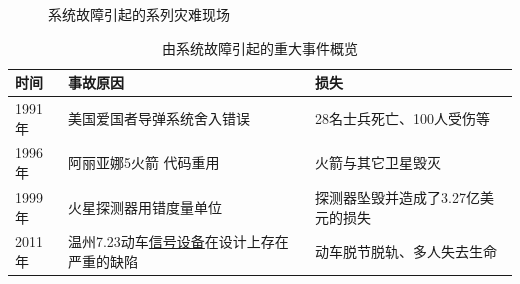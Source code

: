 \documentclass[9pt, CJK]{beamer}
\begin{document}
\begin{frame}
\begin{figure}
				\caption{系统故障引起的系列灾难现场}
			\end{figure}
			\begin{table}[htbp]
				\setlength{\abovecaptionskip}{-0.2cm}  %
				\setlength{\belowcaptionskip}{-0.4cm} %
				\fontsize{7pt}{\baselineskip}\selectfont
				\caption{由系统故障引起的重大事件概览}
				\label{tab:systemEvents_1.1}
				\centering
				\begin{tabular}{p{}p{}p{}}%
					\toprule
					\textbf{时间}&\textbf{事故原因}&\textbf{损失}\\
					\midrule
					1991年 & 美国爱国者导弹系统舍入错误 & 28名士兵死亡、100人受伤等\\
					1996年 & 阿丽亚娜5火箭 代码重用 & 火箭与其它卫星毁灭\\
					1999年 & 火星探测器用错度量单位 & 探测器坠毁并造成了3.27亿美元的损失\\
					2011年 & 温州7.23动车\underline{信号设备}在设计上存在严重的缺陷 &动车脱节脱轨、多人失去生命\\
					\bottomrule
				\end{tabular}
			\end{table}
	\end{frame}
\end{document}
